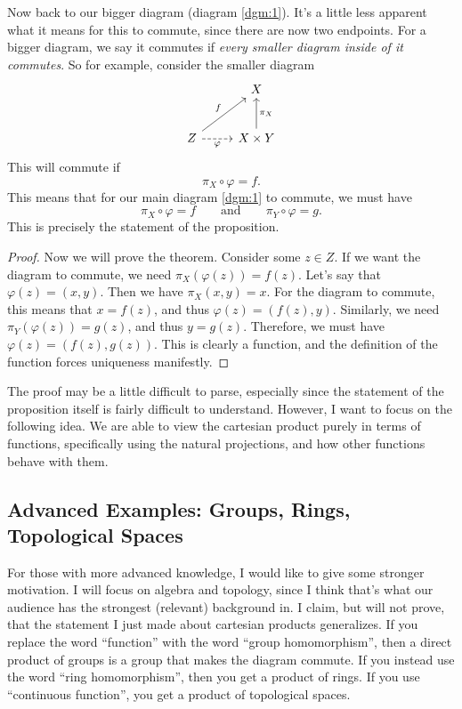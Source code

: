 \documentclass[11pt, letterpaper]{article}
\begin{document}
Now back to our bigger diagram (diagram \ref{dgm:1}). It's a little less apparent what it means for this to commute, since there are now two endpoints. For a bigger diagram, we say it commutes if \emph{every smaller diagram inside of it commutes}. So for example, consider the smaller diagram
\[\begin{tikzcd}[row sep = 2.5em, column sep = 2.5em]
	&X\\
	Z\ar[ur, "f"]\ar[r, dashed, "\varphi "']&X\times Y\ar[u, "\pi _X"']
\end{tikzcd}\]
This will commute if
\[
	\pi_X \circ \varphi =f
.\]
This means that for our main diagram \ref{dgm:1} to commute, we must have
\[
	\pi _X \circ \varphi =f\qquad \text{and} \qquad \pi _Y \circ \varphi =g
.\]
This is precisely the statement of the proposition.
\begin{proof}
	Now we will prove the theorem. Consider some $z\in Z$. If we want the diagram to commute, we need $\pi _X(\varphi (z))=f(z)$. Let's say that $\varphi (z)=(x,y)$. Then we have $\pi _X(x,y)=x$. For the diagram to commute, this means that $x=f(z)$, and thus $\varphi (z)=(f(z),y)$. Similarly, we need $\pi _Y(\varphi (z))=g(z)$, and thus $y=g(z)$. Therefore, we must have $\varphi (z)=(f(z),g(z))$. This is clearly a function, and the definition of the function forces uniqueness manifestly.
\end{proof}

The proof may be a little difficult to parse, especially since the statement of the proposition itself is fairly difficult to understand. However, I want to focus on the following idea. We are able to view the cartesian product purely in terms of functions, specifically using the natural projections, and how other functions behave with them.

\subsection{Advanced Examples: Groups, Rings, Topological Spaces}

For those with more advanced knowledge, I would like to give some stronger motivation. I will focus on algebra and topology, since I think that's what our audience has the strongest (relevant) background in. I claim, but will not prove, that the statement I just made about cartesian products generalizes. If you replace the word ``function'' with the word ``group homomorphism'', then a direct product of groups is a group that makes the diagram commute. If you instead use the word ``ring homomorphism'', then you get a product of rings. If you use ``continuous function'', you get a product of topological spaces.
\end{document}
